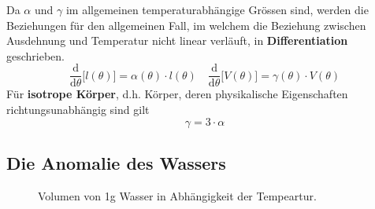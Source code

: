 Da $\alpha$ und $\gamma$ im allgemeinen temperaturabhängige Grössen sind, werden die Beziehungen für den allgemeinen Fall, im welchem die Beziehung zwischen Ausdehnung und Temperatur nicht linear verläuft, in \textbf{Differentiation} geschrieben.
\begin{equation}
\boxed{\dfrac{\text{d}}{\text{d}\theta}\Big[l\left(\theta\right)\Big]=\alpha\left(\theta\right)\cdot l\left(\theta\right)}\quad \boxed{\dfrac{\text{d}}{\text{d}\theta}\Big[V\left(\theta\right)\Big]=\gamma\left(\theta\right)\cdot V\left(\theta\right)}
\end{equation}
Für \textbf{isotrope Körper}, d.h. Körper, deren physikalische Eigenschaften richtungsunabhängig sind gilt
\begin{equation}
\boxed{\gamma=3\cdot \alpha}
\end{equation}
\subsection{Die Anomalie des Wassers}
\begin{figure}[H]
\centering
\caption{Volumen von 1g Wasser in Abhängigkeit der Tempeartur.}
\label{fig_Ie}
\end{figure}
